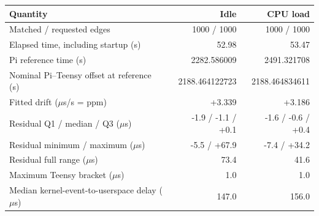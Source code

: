 \begin{tabular}{@{}L{8.3cm}rr@{}}
\toprule
Quantity & Idle & CPU load \\
\midrule
Matched / requested edges & 1000 / 1000 & 1000 / 1000 \\
Elapsed time, including startup (s) & 52.98 & 53.47 \\
Pi reference time (s) & 2282.586009 & 2491.321708 \\
Nominal Pi--Teensy offset at reference (s) & 2188.464122723 & 2188.464834611 \\
Fitted drift ($\mu$s/s = ppm) & +3.339 & +3.186 \\
Residual Q1 / median / Q3 ($\mu$s) & -1.9 / -1.1 / +0.1 & -1.6 / -0.6 / +0.4 \\
Residual minimum / maximum ($\mu$s) & -5.5 / +67.9 & -7.4 / +34.2 \\
Residual full range ($\mu$s) & 73.4 & 41.6 \\
Maximum Teensy bracket ($\mu$s) & 1.0 & 1.0 \\
Median kernel-event-to-userspace delay ($\mu$s) & 147.0 & 156.0 \\
\bottomrule
\end{tabular}
